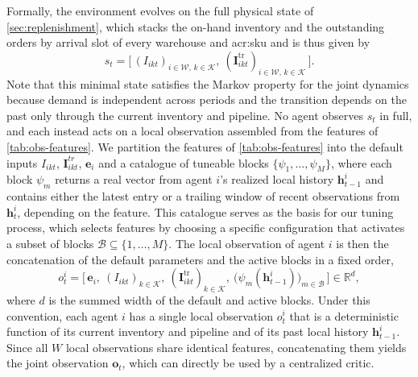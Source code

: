 Formally, the environment evolves on the full physical state of \autoref{sec:replenishment},
which stacks the on-hand inventory and the outstanding orders by arrival slot of every warehouse and \gls{acr:sku} and is thus given by
\begin{equation}
\label{eq:state}
  s_t = \big[\, (I_{ikt})_{i \in \mathcal{W},\, k \in \mathcal{K}},\ (\mathbf{I}^{\mathrm{tr}}_{ikt})_{i \in \mathcal{W},\, k \in \mathcal{K}} \,\big].
\end{equation}
Note that this minimal state satisfies the Markov property for the joint dynamics because demand is independent across periods and the transition depends on the past only through the current inventory and pipeline. No agent observes $s_t$ in full, and each instead acts on a local observation assembled from the features of \autoref{tab:obs-features}.
 We partition the features of \autoref{tab:obs-features} into the default inputs $I_{ikt}$, $\mathbf{I}^{tr}_{ikt}$, $\mathbf{e}_i$ and a catalogue of tuneable blocks $\{\psi_1, \dots, \psi_M\}$, where each block $\psi_m$ returns a real vector from agent $i$'s realized local history $\mathbf{h}^i_{t-1}$ and contains either the latest entry or a trailing window of recent observations from $\mathbf{h}^i_t$, depending on the feature. This catalogue serves as the basis for our tuning process, which selects features by choosing a specific configuration that activates a subset of blocks $\mathcal{B} \subseteq \{1, \dots, M\}$. The local observation of agent $i$ is then the concatenation of the default parameters and the active blocks in a fixed order,
\begin{equation}
\label{eq:observation}
    o^i_t = \big[\, \mathbf{e}_i,\ (I_{ikt})_{k \in \mathcal{K}},\ (\mathbf{I}^{\mathrm{tr}}_{ikt})_{k \in \mathcal{K}},\ \big( \psi_m(\mathbf{h}^i_{t-1}) \big)_{m \in \mathcal{B}} \,\big] \in \mathbb{R}^{d},
\end{equation}
where $d$ is the summed width of the default and active blocks. Under this convention, each agent $i$ has a single local observation $o^i_t$ that is a deterministic function of its current inventory and pipeline and of its past local history $\mathbf{h}^i_{t-1}$. Since all $W$ local observations share identical features, concatenating them yields the joint observation $\mathbf{o}_t$, which can directly be used by a centralized critic.\\


